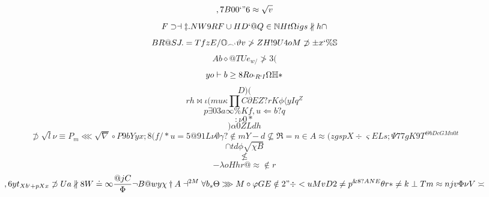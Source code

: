 \documentclass[12pt]{article}
\begin{document}
        \begin{minipage}[t][0pt]{\linewidth}

        \[,7B00`"6\approx\sqrt{v}\]
\[F\supset\dashv\ddagger . N W 9 R F\cup H D ` @ Q\in\mathbb{N} H t\Omega i g s\nparallel h\cap\]
\[BR@SJ.=TfzE/\mathbb{O}_{\frown `}\vartheta v\ngtr Z H ! 9 U 4 o M\not\supset\pm x `\%\mathbb{S}\]
\[Ab\diamond @ T U e_{w/}\ngtr 3 (\]
\[yo\vdash b\geq 8 R o_{`R`I}\Omega\mathbb{H} *\]
\[D {)(}\]
\[rh\bowtie\iota ( m u\kappa\prod C\partial E Z ? r K {\phi}\langle y I q^{Z}\]
\[p\exists 0 3 a\infty\% K f , {u}\Longleftarrow b ? q\]
\[:\nu 0 *\]
\[)\alpha 0 Z L d h\]
\[\not\supset\sqrt{l}\nu\equiv P_{m}\lll\sqrt{\nabla}\circ P 9 b Y y x ; 8 ( f / * u = 5 @ 9 1 L\nu\emptyset\gamma ?\notin {mY-d}\nsubseteq\Re = n\in A\approx ( z g s p X\div\varsigma E L s {;}\Psi 7 7 g K 9 T^{\Theta b D c G M n 0 t}\]
\[\cap t d\phi\sqrt{\chi B}\]
\[\nleq\]
\[-\lambda o H h r @\approx\notin r\]
\[,6yt_{Xb`+pXx}\not\supset U a\nparallel 8 W\doteq\infty\frac{@jC}{\Phi}\neg B @ w y {\chi}\dagger A\dashv^{2M}\forall b_{s}\Theta\ggg M\circ\varphi G E\notin 2 "\div < u M v D 2\neq p^{\& 8 ? A N E}\theta r *\neq k\perp T m\approx n j v\Phi\nu V\asymp
        \]
\end{minipage}
\end{document}
